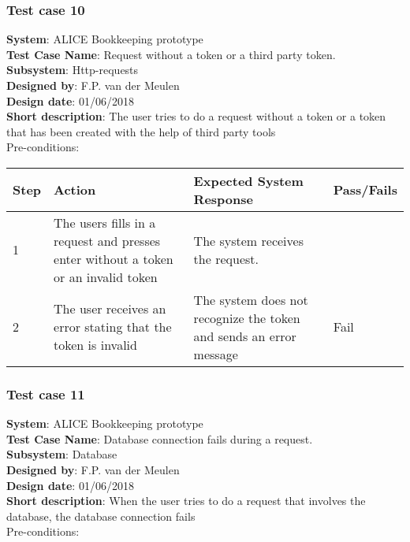 \subsubsection{Test case 10}
\textbf{System}:  ALICE Bookkeeping prototype \\
\textbf{Test Case Name}:  Request without a token or a third party token. \\
\textbf{Subsystem}:  Http-requests \\
\textbf{Designed by}:  F.P. van der Meulen\\
\textbf{Design date}:  01/06/2018\\
\textbf{Short description}: The user tries to do a request without a token or a token that has been created with the help of third party tools \\

Pre-conditions: \\

\begin{longtable}{ | p{0.8cm} | p{4.5cm} | p{6cm} | p{1.5cm} |}
\hline
Step & Action & Expected System Response & Pass/Fails  \\ \hline
1 & The users fills in a request and presses enter without a token or an invalid token & The system receives the request. &  \\ \hline
2 & The user receives an error stating that the token is invalid & The system does not recognize the token and sends an error message & Fail \\ \hline
\end{longtable}
\subsubsection{Test case 11}
\textbf{System}:  ALICE Bookkeeping prototype \\
\textbf{Test Case Name}:  Database connection fails during a request. \\
\textbf{Subsystem}:  Database \\
\textbf{Designed by}:  F.P. van der Meulen\\
\textbf{Design date}:  01/06/2018\\
\textbf{Short description}: When the user tries to do a request that involves the database, the database connection fails \\

Pre-conditions: \\

